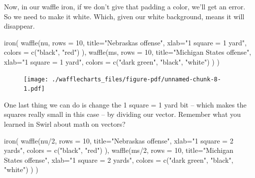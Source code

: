 \documentclass[
  letterpaper,
  DIV=11,
  numbers=noendperiod]{scrreprt}
\newenvironment{Shaded}{\begin{snugshade}}{\end{snugshade}}
\newcommand{\AttributeTok}[1]{\textcolor[rgb]{0.40,0.45,0.13}{#1}}
\newcommand{\DecValTok}[1]{\textcolor[rgb]{0.68,0.00,0.00}{#1}}
\newcommand{\FunctionTok}[1]{\textcolor[rgb]{0.28,0.35,0.67}{#1}}
\newcommand{\NormalTok}[1]{\textcolor[rgb]{0.00,0.23,0.31}{#1}}
\newcommand{\SpecialCharTok}[1]{\textcolor[rgb]{0.37,0.37,0.37}{#1}}
\newcommand{\StringTok}[1]{\textcolor[rgb]{0.13,0.47,0.30}{#1}}
\begin{document}
Now, in our waffle iron, if we don't give that padding a color, we'll
get an error. So we need to make it white. Which, given our white
background, means it will disappear.

\begin{Shaded}
\begin{Highlighting}[]
\FunctionTok{iron}\NormalTok{(}
 \FunctionTok{waffle}\NormalTok{(nu, }
        \AttributeTok{rows =} \DecValTok{10}\NormalTok{, }
        \AttributeTok{title=}\StringTok{"Nebraska\textquotesingle{}s offense"}\NormalTok{, }
        \AttributeTok{xlab=}\StringTok{"1 square = 1 yard"}\NormalTok{, }
        \AttributeTok{colors =} \FunctionTok{c}\NormalTok{(}\StringTok{"black"}\NormalTok{, }\StringTok{"red"}\NormalTok{)}
\NormalTok{        ),}
 \FunctionTok{waffle}\NormalTok{(ms, }
        \AttributeTok{rows =} \DecValTok{10}\NormalTok{, }
        \AttributeTok{title=}\StringTok{"Michigan State\textquotesingle{}s offense"}\NormalTok{, }
        \AttributeTok{xlab=}\StringTok{"1 square = 1 yard"}\NormalTok{, }
        \AttributeTok{colors =} \FunctionTok{c}\NormalTok{(}\StringTok{"dark green"}\NormalTok{, }\StringTok{"black"}\NormalTok{, }\StringTok{"white"}\NormalTok{)}
\NormalTok{        )}
\NormalTok{)}
\end{Highlighting}
\end{Shaded}

\begin{figure}[H]

{\centering \texttt{[image: ./wafflecharts\_files/figure-pdf/unnamed-chunk-8-1.pdf]}

}

\end{figure}

One last thing we can do is change the 1 square = 1 yard bit -- which
makes the squares really small in this case -- by dividing our vector.
Remember what you learned in Swirl about math on vectors?

\begin{Shaded}
\begin{Highlighting}[]
\FunctionTok{iron}\NormalTok{(}
 \FunctionTok{waffle}\NormalTok{(nu}\SpecialCharTok{/}\DecValTok{2}\NormalTok{, }
        \AttributeTok{rows =} \DecValTok{10}\NormalTok{, }
        \AttributeTok{title=}\StringTok{"Nebraska\textquotesingle{}s offense"}\NormalTok{, }
        \AttributeTok{xlab=}\StringTok{"1 square = 2 yards"}\NormalTok{, }
        \AttributeTok{colors =} \FunctionTok{c}\NormalTok{(}\StringTok{"black"}\NormalTok{, }\StringTok{"red"}\NormalTok{)}
\NormalTok{        ),}
 \FunctionTok{waffle}\NormalTok{(ms}\SpecialCharTok{/}\DecValTok{2}\NormalTok{, }
        \AttributeTok{rows =} \DecValTok{10}\NormalTok{, }
        \AttributeTok{title=}\StringTok{"Michigan State\textquotesingle{}s offense"}\NormalTok{, }
        \AttributeTok{xlab=}\StringTok{"1 square = 2 yards"}\NormalTok{, }
        \AttributeTok{colors =} \FunctionTok{c}\NormalTok{(}\StringTok{"dark green"}\NormalTok{, }\StringTok{"black"}\NormalTok{, }\StringTok{"white"}\NormalTok{)}
\NormalTok{        )}
\NormalTok{)}
\end{Highlighting}
\end{Shaded}
\end{document}
